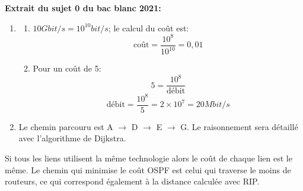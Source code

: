 \documentclass[a4paper,11pt]{article}
\begin{document}
\begin{exo}
\textbf{Extrait du sujet 0 du bac blanc 2021: }
\begin{enumerate}
    \item \begin{enumerate}
        \item $10Gbit/s = 10^{10}bit/s$; le calcul du coût est:
        $$\mbox{coût} = \dfrac{10^8}{10^{10}}=0,01$$
        \item Pour un coût de 5:
        $$5=\dfrac{10^8}{\mbox{débit}}$$
        $$\mbox{débit}=\dfrac{10^8}{5}=2×10^7=20Mbit/s$$
    \end{enumerate}
    \item Le chemin parcouru est A $\rightarrow$ D $\rightarrow$ E $\rightarrow$ G. Le raisonnement sera détaillé avec l'algorithme de Dijkstra.
\end{enumerate}
\end{exo}
\begin{exo}
Si tous les liens utilisent la même technologie alors le coût de chaque lien est le même. Le chemin qui minimise le coût OSPF est celui qui traverse le moins de routeurs, ce qui correspond également à la distance calculée avec RIP.
\end{exo}
\end{document}
